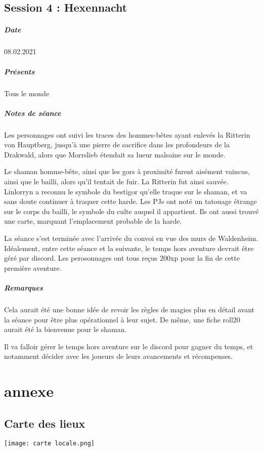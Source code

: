\documentclass[10pt,a4paper]{book}
\begin{document}
\section{Session 4 : Hexennacht}
\paragraph{Date}08.02.2021
\paragraph{Présents} Tous le monde
\paragraph{Notes de séance}
Les personnages ont suivi les traces des hommes-bêtes ayant enlevés la Ritterin von Hauptberg, jusqu'à une pierre de sacrifice dans les profondeurs de la Drakwald, alors que Morrslieb étendait sa lueur malsaine sur le monde.

Le shaman homme-bête, ainsi que les gors à proximité furent aisément vaincus, ainsi que le bailli, alors qu'il tentait de fuir. La Ritterin fut ainsi sauvée. Linlorryn a reconnu le symbole du bestigor qu'elle traque sur le shaman, et va sans doute continuer à traquer cette harde. Les PJs ont noté un tatouage étrange sur le corps du bailli, le symbole du culte auquel il appartient. Ils ont aussi trouvé une carte, marquant l'emplacement probable de la harde.

La séance s'est terminée avec l'arrivée du convoi en vue des murs de Waldenheim. Idéalement, entre cette séance et la suivante, le temps hors aventure devrait être géré par discord. Les perosonnages ont tous reçus 200xp pour la fin de cette première aventure.

\paragraph{Remarques}
Cela aurait été une bonne idée de revoir les règles de magies plus en détail avant la séance pour être plus opérationnel à leur sujet. De même, une fiche roll20 aurait été la bienvenue pour le shaman.

Il va falloir gérer le temps hors aventure sur le discord pour gagner du temps, et notamment décider avec les joueurs de leurs avancements et récompenses.
\chapter*{annexe}
\section{Carte des lieux}
\texttt{[image: carte locale.png]}
\end{document}
